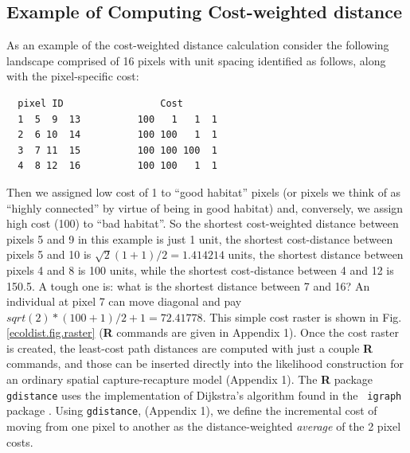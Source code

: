 \documentclass[12pt]{article}
\begin{document}
\begin{spacing}{1.8}
\subsection{Example of Computing Cost-weighted distance}

As an example of the cost-weighted distance calculation consider the
following landscape comprised of 16 pixels with unit spacing
identified as follows, along with the pixel-specific cost:
\begin{center}
\begin{verbatim}
  pixel ID                 Cost
  1  5  9  13          100   1   1  1
  2  6 10  14          100 100   1  1
  3  7 11  15          100 100 100  1
  4  8 12  16          100 100   1  1
\end{verbatim}
\end{center}
Then we assigned low cost of 1 to ``good habitat'' pixels (or pixels
we think of as ``highly connected'' by virtue of being in good
habitat) and, conversely, we assign high cost (100) to ``bad
habitat''. So the shortest cost-weighted distance between pixels 5 and
9 in this example is just 1 unit, the shortest cost-distance between
pixels 5 and 10 is $\sqrt{2}(1+1)/2 = 1.414214$ units, the shortest
distance between pixels 4 and 8 is 100 units, while the shortest
cost-distance between 4 and 12 is 150.5. A tough one is: what is the
shortest distance between 7 and 16? An individual at pixel 7 can move
diagonal and pay $sqrt(2)*(100+1)/2 + 1 =72.41778$.  This simple cost
raster is shown in Fig. \ref{ecoldist.fig.raster} ({\bf R} commands
are given in Appendix 1).  Once the cost raster is created, the
least-cost path distances are computed with just a couple {\bf R}
commands, and those can be inserted directly into the likelihood
construction for an ordinary spatial capture-recapture model (Appendix
1). The {\bf R} package \mbox{\tt gdistance} uses the implementation
of Dijkstra's algorithm \citep{dijkstra:1959} found in the \mbox{\tt
  igraph} package \citep{csardi:2010}.  Using \mbox{\tt gdistance},
(Appendix 1), we define the incremental cost of moving from one pixel
to another as the distance-weighted {\it average} of the 2 pixel
costs.

\end{spacing}
\end{document}
